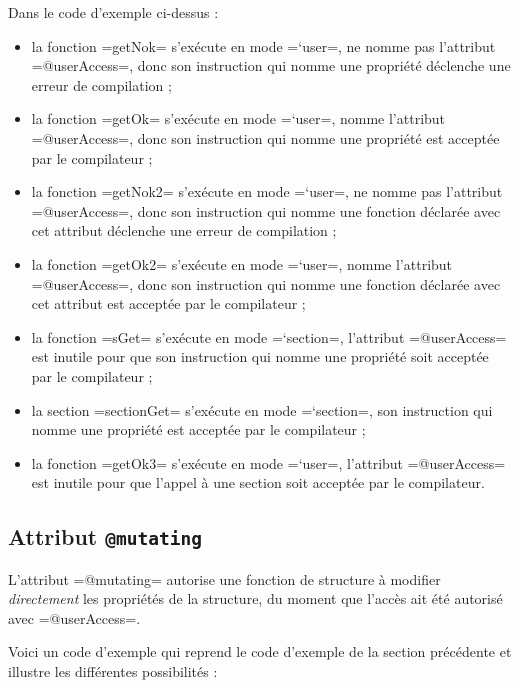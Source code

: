 Dans le code d'exemple ci-dessus :
\begin{itemize}
  \item la fonction \plm=getNok= s'exécute en mode \plm=`user=, ne nomme pas l'attribut \plm=@userAccess=, donc son instruction qui nomme une propriété déclenche une erreur de compilation ;
  \item la fonction \plm=getOk= s'exécute en mode \plm=`user=, nomme l'attribut \plm=@userAccess=, donc son instruction qui nomme une propriété est acceptée par le compilateur ;
  \item la fonction \plm=getNok2= s'exécute en mode \plm=`user=, ne nomme pas l'attribut \plm=@userAccess=, donc son instruction qui nomme une fonction déclarée avec cet attribut déclenche une erreur de compilation ;
  \item la fonction \plm=getOk2= s'exécute en mode \plm=`user=, nomme l'attribut \plm=@userAccess=, donc son instruction qui nomme une fonction déclarée avec cet attribut est acceptée par le compilateur ;
  \item la fonction \plm=sGet= s'exécute en mode \plm=`section=, l'attribut \plm=@userAccess= est inutile pour que son instruction qui nomme une propriété soit acceptée par le compilateur ;
  \item la section \plm=sectionGet= s'exécute en mode \plm=`section=, son instruction qui nomme une propriété est acceptée par le compilateur ;
  \item la fonction \plm=getOk3= s'exécute en mode \plm=`user=, l'attribut \plm=@userAccess= est inutile pour que l'appel à une section soit acceptée par le compilateur.
\end{itemize}



\subsection{Attribut \texttt{@mutating}}

L'attribut \plm=@mutating= autorise une fonction de structure à modifier \emph{directement} les propriétés de la structure, du moment que l'accès ait été autorisé avec \plm=@userAccess=.

Voici un code d'exemple qui reprend le code d'exemple de la section précédente et illustre les différentes possibilités :

